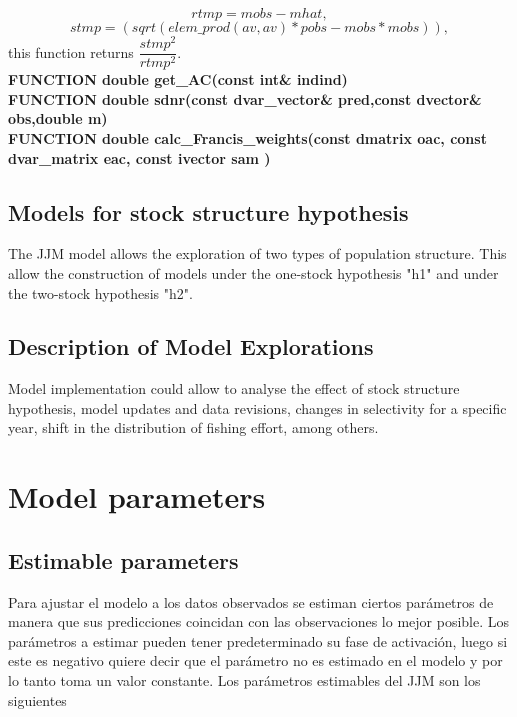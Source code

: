 \documentclass{article}
\begin{document}
\begin{equation}
    rtmp = mobs-mhat,
\end{equation}
\begin{equation}
    stmp = (sqrt(elem\_prod(av,av)*pobs - mobs*mobs)),
\end{equation}
this function returns $\dfrac{stmp^2}{rtmp^2}$.\\

\textbf{FUNCTION double get\_AC(const int\& indind)}\\





\textbf{FUNCTION double sdnr(const dvar\_vector\& pred,const dvector\& obs,double m)}\\
\textbf{FUNCTION double calc\_Francis\_weights(const dmatrix oac, const dvar\_matrix eac, const ivector sam )}\\







\subsection{Models for stock structure hypothesis}

The JJM model allows the exploration of two types of population structure. This allow the construction of models under the one-stock hypothesis "h1" and under the two-stock hypothesis "h2".

\subsection{Description of Model Explorations}

Model implementation could allow to analyse the effect of stock structure hypothesis, model updates and data revisions, changes in selectivity for a specific year, shift in the distribution of fishing effort, among others. 

\section{Model parameters}
\subsection{Estimable parameters}
Para ajustar el modelo a los datos observados se estiman ciertos parámetros de manera que sus predicciones coincidan con las observaciones lo mejor posible. Los parámetros a estimar pueden tener predeterminado su fase de activación, luego si este es negativo quiere decir que el parámetro no es estimado en el modelo y por lo tanto toma un valor constante. Los parámetros estimables del JJM son los siguientes 
\end{document}

